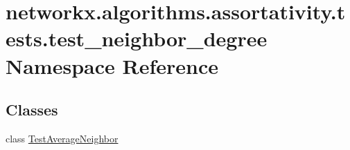 \hypertarget{namespacenetworkx_1_1algorithms_1_1assortativity_1_1tests_1_1test__neighbor__degree}{}\section{networkx.\+algorithms.\+assortativity.\+tests.\+test\+\_\+neighbor\+\_\+degree Namespace Reference}
\label{namespacenetworkx_1_1algorithms_1_1assortativity_1_1tests_1_1test__neighbor__degree}
\subsection*{Classes}
\begin{DoxyCompactItemize}
\item 
class \hyperlink{classnetworkx_1_1algorithms_1_1assortativity_1_1tests_1_1test__neighbor__degree_1_1TestAverageNeighbor}{Test\+Average\+Neighbor}
\end{DoxyCompactItemize}
